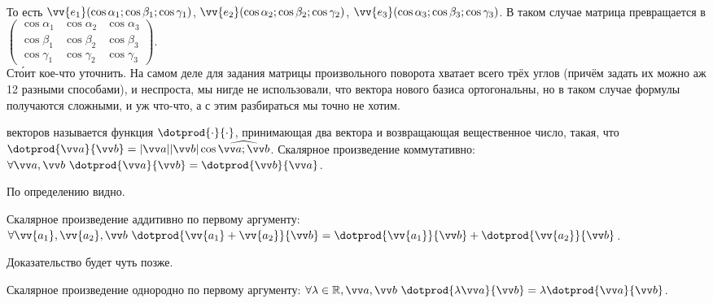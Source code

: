 \documentclass{article}
\let\vec\vv
\begin{document}
\begin{itemize}
\begin{Comment}
\\
            То есть $\vec{e_1}(\cos\alpha_1;\cos\beta_1;\cos\gamma_1)$, $\vec{e_2}(\cos\alpha_2;\cos\beta_2;\cos\gamma_2)$, $\vec{e_3}(\cos\alpha_3;\cos\beta_3;\cos\gamma_3)$. В таком случае матрица превращается в $\left(\begin{matrix}
                \cos\alpha_1 & \cos\alpha_2 & \cos\alpha_3\\
                \cos\beta_1 & \cos\beta_2 & \cos\beta_3\\
                \cos\gamma_1 & \cos\gamma_2 & \cos\gamma_3
            \end{matrix}\right)$.\\
            Ст\'{о}ит кое-что уточнить. На самом деле для задания матрицы произвольного поворота хватает всего трёх углов (причём задать их можно аж 12 разными способами), и неспроста, мы нигде не использовали, что вектора нового базиса ортогональны, но в таком случае формулы получаются сложными, и уж что-что, а с этим разбираться мы точно не хотим.
        \end{Comment}
        \dfn {} векторов называется функция $\dotprod{\cdot}{\cdot}$, принимающая два вектора и возвращающая вещественное число, такая, что $\dotprod{\vec a}{\vec b}=|\vec a||\vec b|\cos\widehat{\vec a;\vec b}$.
        \thm Скалярное произведение коммутативно: $\forall \vec a,\vec b~\dotprod{\vec a}{\vec b}=\dotprod{\vec b}{\vec a}$.
        \begin{Proof}
            По определению видно.
        \end{Proof}
        \thm Скалярное произведение аддитивно по первому аргументу: $\forall\vec{a_1},\vec{a_2},\vec b~\dotprod{\vec{a_1}+\vec{a_2}}{\vec b}=\dotprod{\vec{a_1}}{\vec b}+\dotprod{\vec{a_2}}{\vec b}$.
        \begin{Proof}
            Доказательство будет чуть позже.
        \end{Proof}
        \thm Скалярное произведение однородно по первому аргументу: $\forall\lambda\in\mathbb R,\vec a,\vec b~\dotprod{\lambda\vec a}{\vec b}=\lambda\dotprod{\vec a}{\vec b}$.
        \begin{Proof}

\end{Proof}
\end{itemize}
\end{document}
